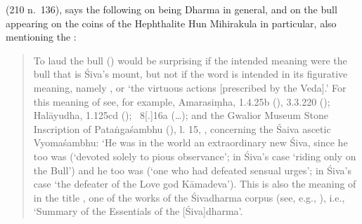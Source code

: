 %


\noindent
{} (210 n.~136), 
says the following on  being Dharma
in general, and on the bull appearing on the coins of the 
Hephthalite Hun Mihirakula in particular, also
mentioning the \VSS: 

\begin{quote}
To laud the bull () 
would be surprising if the intended meaning were 
the bull that is Śiva's mount, but not if the word is intended in its figurative meaning, namely , 
or  `the virtuous actions [prescribed by
the Veda].' For this meaning of  see, for example,
Amarasiṃha,  
1.4.25b (),
3.3.220 (); 
Halāyudha,
 1.125cd (); 
\Manu\ 8[.]16a
(\dots); 
and the Gwalior Museum Stone
Inscription of Pataṅgaśambhu (), l. 15,
, 
concerning the Śaiva ascetic Vyomaśambhu: 
`He was in the
world an extraordinary new Śiva, since he too was 
(`devoted solely to pious observance'; 
in Śiva's case `riding only on the Bull') and he too was 
 (`one who had defeated sensual
urges'; in Śiva's case `the defeater of the Love god Kāmadeva'). 
This is also the meaning of  in the title \Vss,
one of the works of the Śivadharma corpus 
(see, e.g., ), i.e., 
`Summary of the Essentials of the [Śiva]dharma'. 
\end{quote}

